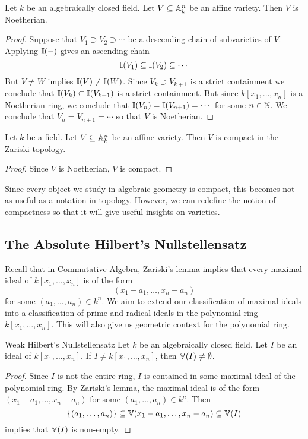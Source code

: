 \documentclass[a4paper]{article}
\begin{document}
\begin{prp}{}{} Let $k$ be an algebraically closed field. Let $V\subseteq\mathbb{A}_k^n$ be an affine variety. Then $V$ is Noetherian. \tcbline
\begin{proof}
Suppose that $V_1\supset V_2\supset\cdots$ be a descending chain of subvarieties of $V$. Applying $\mathbb{I}(-)$ gives an ascending chain $$\mathbb{I}(V_1)\subseteq\mathbb{I}(V_2)\subseteq\cdots$$ But $V\neq W$ implies $\mathbb{I}(V)\neq\mathbb{I}(W)$. Since $V_k\supset V_{k+1}$ is a strict containment we conclude that $\mathbb{I}(V_k)\subset\mathbb{I}(V_{k+1})$ is a strict containment. But since $k[x_1,\dots,x_n]$ is a Noetherian ring, we conclude that $\mathbb{I}(V_n)=\mathbb{I}(V_{n+1})=\cdots$ for some $n\in\mathbb{N}$. We conclude that $V_n=V_{n+1}=\cdots$ so that $V$ is Noetherian. 
\end{proof}
\end{prp}

\begin{crl}{}{} Let $k$ be a field. Let $V\subseteq\mathbb{A}_k^n$ be an affine variety. Then $V$ is compact in the Zariski topology. \tcbline
\begin{proof}
Since $V$ is Noetherian, $V$ is compact. 
\end{proof}
\end{crl}

Since every object we study in algebraic geometry is compact, this becomes not as useful as a notation in topology. However, we can redefine the notion of compactness so that it will give useful insights on varieties. 

\subsection{The Absolute Hilbert's Nullstellensatz}
Recall that in Commutative Algebra, Zariski's lemma implies that every maximal ideal of $k[x_1,\dots,x_n]$ is of the form $$(x_1-a_1,\dots,x_n-a_n)$$ for some $(a_1,\dots,a_n)\in k^n$. We aim to extend our classification of maximal ideals into a classification of prime and radical ideals in the polynomial ring $k[x_1,\dots,x_n]$. This will also give us geometric context for the polynomial ring. 

\begin{thm}{Weak Hilbert's Nullstellensatz}{} Let $k$ be an algebraically closed field. Let $I$ be an ideal of $k[x_1,\dots,x_n]$. If $I\neq k[x_1,\dots,x_n]$, then $\mathbb{V}(I)\neq\emptyset$. \tcbline
\begin{proof}
Since $I$ is not the entire ring, $I$ is contained in some maximal ideal of the polynomial ring. By Zariski's lemma, the maximal ideal is of the form $(x_1-a_1,\dots,x_n-a_n)$ for some $(a_1,\dots,a_n)\in k^n$. Then $$\{(a_1,\dots,a_n)\}\subseteq\mathbb{V}(x_1-a_1,\dots,x_n-a_n)\subseteq\mathbb{V}(I)$$ implies that $\mathbb{V}(I)$ is non-empty. 
\end{proof}
\end{thm}
\end{document}
